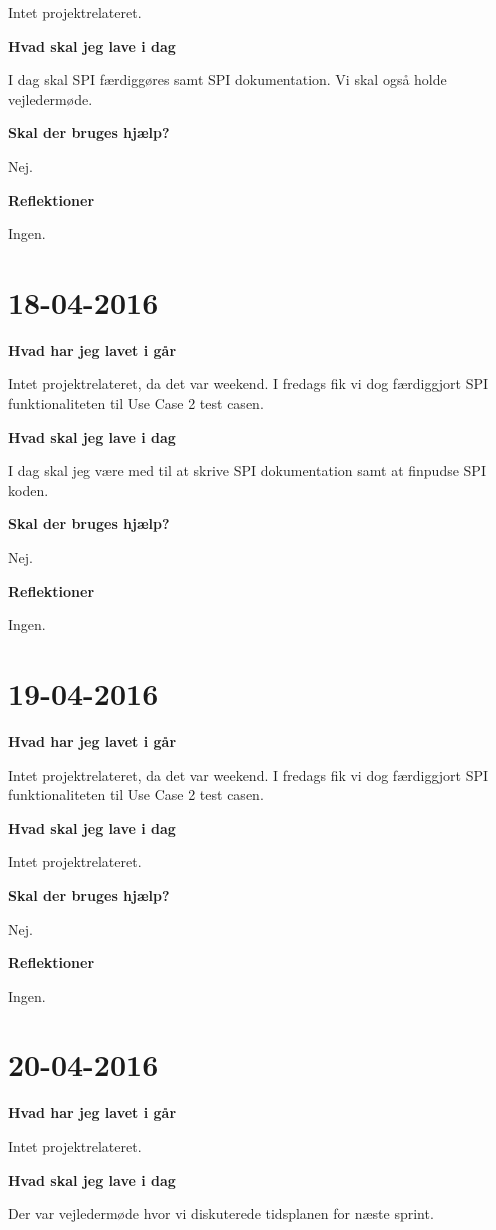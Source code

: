 \documentclass{article}
\begin{document}
	Intet projektrelateret.
	
	\textbf{Hvad skal jeg lave i dag}
	
	I dag skal SPI færdiggøres samt SPI dokumentation. Vi skal også holde vejledermøde.
	
	\textbf{Skal der bruges hjælp?}
	
	Nej.
	
	\textbf{Reflektioner}
	
	Ingen.
	
	\section{18-04-2016}
	\textbf{Hvad har jeg lavet i går}
	
	Intet projektrelateret, da det var weekend. I fredags fik vi dog færdiggjort SPI funktionaliteten til Use Case 2 test casen.
	
	\textbf{Hvad skal jeg lave i dag}
	
	I dag skal jeg være med til at skrive SPI dokumentation samt at finpudse SPI koden.
	
	\textbf{Skal der bruges hjælp?}
	
	Nej.
	
	\textbf{Reflektioner}
	
	Ingen.
	
	\section{19-04-2016}
	\textbf{Hvad har jeg lavet i går}
	
	Intet projektrelateret, da det var weekend. I fredags fik vi dog færdiggjort SPI funktionaliteten til Use Case 2 test casen.
	
	\textbf{Hvad skal jeg lave i dag}
	
	Intet projektrelateret.
	
	\textbf{Skal der bruges hjælp?}
	
	Nej.
	
	\textbf{Reflektioner}
	
	Ingen.
	
	\section{20-04-2016}
	\textbf{Hvad har jeg lavet i går}
	
	Intet projektrelateret.
	
	\textbf{Hvad skal jeg lave i dag}
	
	Der var vejledermøde hvor vi diskuterede tidsplanen for næste sprint.
	
\end{document}
